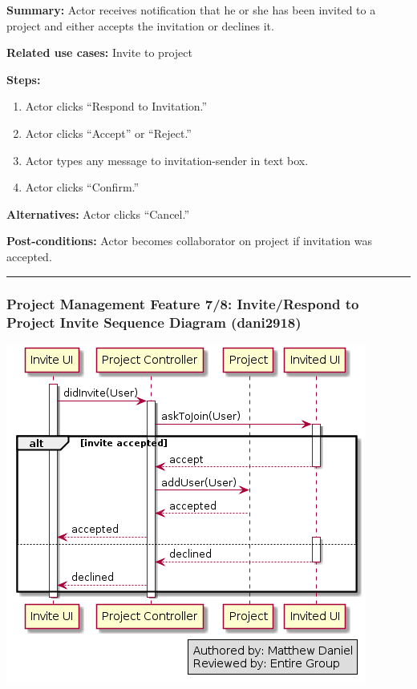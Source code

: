 \documentclass[twoside,letterpaper]{article}
\begin{document}
\noindent \textbf{Summary:} Actor receives notification that he or she has been invited to a project and either accepts the invitation or declines it. \newline

\noindent \textbf{Related use cases:} Invite to project \newline

\noindent \textbf{Steps:} \begin{enumerate}
  \item Actor clicks ``Respond to Invitation.''
  \item Actor clicks ``Accept'' or ``Reject.''
  \item Actor types any message to invitation-sender in text box.
  \item Actor clicks ``Confirm.''
 \end{enumerate}
 
\noindent  \textbf{Alternatives:} Actor clicks ``Cancel.'' \newline

\noindent  \textbf{Post-conditions:} Actor becomes collaborator on project if invitation was accepted. \newline
\vspace{8pt}
\hrule
\vspace{20pt} \newpage

\subsubsection[Project Management Feature 7/8: Invite/Respond to Project Invite Sequence Diagram (dani2918)]{\rmfamily\bfseries\color{black}
	Project Management Feature 7/8:  Invite/Respond to Project Invite Sequence Diagram (dani2918)}

\bigskip

\includegraphics[width=\textwidth]{images/SequenceDiagrams/PMInviteToProject}
\newpage
\end{document}
